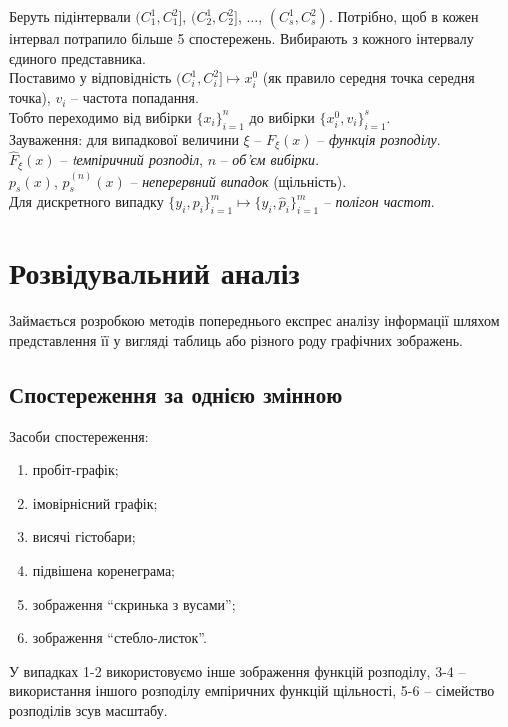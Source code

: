 Беруть підінтервали $(C_1^1, C_1^2]$, $(C_2^1, C_2^2]$, $\ldots$, $(C_s^1, C_s^2)$. Потрібно, щоб в кожен інтервал потрапило більше 5 спостережень. Вибирають з кожного інтервалу єдиного представника. \\

Поставимо у відповідність $(C_i^1, C_i^2] \mapsto x_i^0$ (як правило середня точка середня точка), $v_i$ -- частота попадання. \\

Тобто переходимо від вибірки $\{x_i\}_{i=1}^n$ до вибірки $\{x_i^0, v_i\}_{i=1}^s$. \\

Зауваження: для випадкової величини $\xi$ -- $F_\xi(x)$ -- \textit{функція розподілу}. \\

$\widehat{F}_\xi(x)$ -- \textit{tемпіричний розподіл}, $n$ -- \textit{об'єм вибірки}. \\

$p_s(x)$, $\widehat{p}_s^{(n)}(x)$ -- \textit{неперервний випадок} (щільність). \\

Для дискретного випадку $\{y_i, p_i\}_{i=1}^m \mapsto \{ y_i, \widehat{p}_i\}_{i=1}^m$ -- \textit{полігон частот}.

\section{Розвідувальний аналіз}

Займається розробкою методів попереднього експрес аналізу інформації шляхом представлення її у вигляді таблиць або різного роду графічних зображень.

\subsection{Спостереження за однією змінною}

Засоби спостереження:
\begin{enumerate}
	\item пробіт-графік;
	\item імовірнісний графік;
	\item висячі гістобари;
	\item підвішена коренеграма;
	\item зображення ``скринька з вусами'';
	\item зображення ``стебло-листок''.
\end{enumerate}

У випадках 1-2 використовуємо інше зображення функцій розподілу, 3-4 -- використання іншого розподілу емпіричних функцій щільності, 5-6 -- сімейство розподілів зсув масштабу. \\

